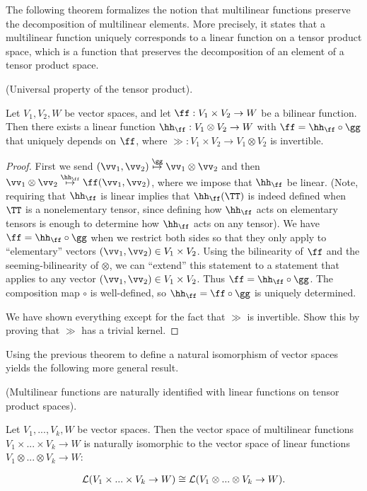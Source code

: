 The following theorem formalizes the notion that multilinear functions preserve the decomposition of multilinear elements. More precisely, it states that a multilinear function uniquely corresponds to a linear function on a tensor product space, which is a function that preserves the decomposition of an element of a tensor product space.

\begin{theorem}
\label{ch::lin_alg::thm::universal_prop_tensor_prod}
    (Universal property of the tensor product).

    Let $V_1, V_2, W$ be vector spaces, and let $\ff:V_1 \times V_2 \rightarrow W$ be a bilinear function. Then there exists a linear function $\hh_\ff:V_1 \otimes V_2 \rightarrow W$ with $\ff = \hh_\ff \circ \gg$ that uniquely depends on $\ff$, where $\gg:V_1 \times V_2 \rightarrow V_1 \otimes V_2$ is invertible.
\end{theorem}

\begin{proof}
    First we send $(\vv_1, \vv_2) \overset{\gg}{\mapsto} \vv_1 \otimes \vv_2$ and then $\vv_1 \otimes \vv_2 \overset{\hh_\ff}{\mapsto} \ff(\vv_1, \vv_2)$, where we impose that $\hh_\ff$ be linear. (Note, requiring that $\hh_\ff$ is linear implies that $\hh_\ff(\TT)$ is indeed defined when $\TT$ is a nonelementary tensor, since defining how $\hh_\ff$ acts on elementary tensors is enough to determine how $\hh_\ff$ acts on any tensor). We have $\ff = \hh_\ff \circ \gg$ when we restrict both sides so that they only apply to ``elementary'' vectors $(\vv_1, \vv_2) \in V_1 \times V_2$. Using the bilinearity of $\ff$ and the seeming-bilinearity of $\otimes$, we can ``extend'' this statement to a statement that applies to any vector $(\vv_1, \vv_2) \in V_1 \times V_2$. Thus $\ff = \hh_\ff \circ \gg$. The composition map $\circ$ is well-defined, so $\hh_\ff = \ff \circ \gg$ is uniquely determined.
    
    We have shown everything except for the fact that $\gg$ is invertible. Show this by proving that $\gg$ has a trivial kernel.
\end{proof}

Using the previous theorem to define a natural isomorphism of vector spaces yields the following more general result.

\begin{theorem}
\label{ch::motivated_intro::thm::multilin_fns_iso_lin_fns}
    (Multilinear functions are naturally identified with linear functions on tensor product spaces).
    
    Let $V_1, ..., V_k, W$ be vector spaces. Then the vector space of multilinear functions $V_1 \times ... \times V_k \rightarrow W$ is naturally isomorphic to the vector space of linear functions $V_1 \otimes ... \otimes V_k \rightarrow W$:
    
    \begin{align*}
        \mathcal{L}(V_1 \times ... \times V_k \rightarrow W) \cong \mathcal{L}(V_1 \otimes ... \otimes V_k \rightarrow W).
    \end{align*}
\end{theorem}

